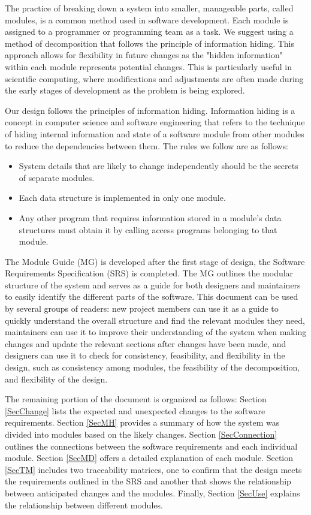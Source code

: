 \documentclass[12pt, titlepage]{article}
\begin{document}
The practice of breaking down a system into smaller, manageable parts, called modules, is a common method used in software development. Each module is assigned to a programmer or programming team as a task. We suggest using a method of decomposition that follows the principle of information hiding. This approach allows for flexibility in future changes as the "hidden information" within each module represents potential changes. This is particularly useful in scientific computing, where modifications and adjustments are often made during the early stages of development as the problem is being explored.  

Our design follows the principles of information hiding. Information hiding is a concept in computer science and software engineering that refers to the technique of hiding internal information and state of a software module from other modules to reduce the dependencies between them. The rules we follow are as follows:

\begin{itemize}
\item System details that are likely to change independently should be the secrets of separate modules.
\item Each data structure is implemented in only one module.
\item Any other program that requires information stored in a module’s data structures must obtain it by calling access programs belonging to that module.
\end{itemize}

The Module Guide (MG) is developed after the first stage of design, the Software Requirements Specification (SRS) is completed. The MG outlines the modular structure of the system and serves as a guide for both designers and maintainers to easily identify the different parts of the software. This document can be used by several groups of readers: new project members can use it as a guide to quickly understand the overall structure and find the relevant modules they need, maintainers can use it to improve their understanding of the system when making changes and update the relevant sections after changes have been made, and designers can use it to check for consistency, feasibility, and flexibility in the design, such as consistency among modules, the feasibility of the decomposition, and flexibility of the design.

The remaining portion of the document is organized as follows: Section \ref{SecChange} lists the expected and unexpected changes to the software requirements. Section \ref{SecMH} provides a summary of how the system was divided into modules based on the likely changes. Section \ref{SecConnection} outlines the connections between the software requirements and each individual module. Section \ref{SecMD} offers a detailed explanation of each module. Section \ref{SecTM} includes two traceability matrices, one to confirm that the design meets the requirements outlined in the SRS and another that shows the relationship between anticipated changes and the modules. Finally, Section \ref{SecUse} explains the relationship between different modules.
\end{document}
